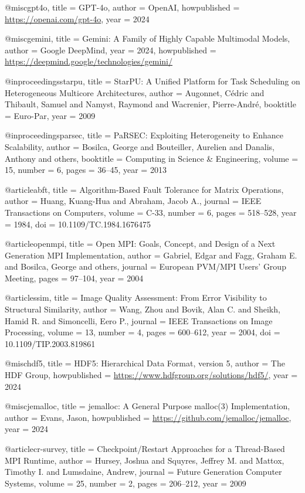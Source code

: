 @misc{gpt4o,
  title = {{GPT-4o}},
  author = {{OpenAI}},
  howpublished = {\url{https://openai.com/gpt-4o}},
  year = {2024}
}

@misc{gemini,
  title = {{Gemini}: A Family of Highly Capable Multimodal Models},
  author = {{Google DeepMind}},
  year = {2024},
  howpublished = {\url{https://deepmind.google/technologies/gemini/}}
}

@inproceedings{starpu,
  title = {{StarPU}: A Unified Platform for Task Scheduling on Heterogeneous Multicore Architectures},
  author = {Augonnet, C{\'e}dric and Thibault, Samuel and Namyst, Raymond and Wacrenier, Pierre-Andr{\'e}},
  booktitle = {Euro-Par},
  year = {2009}
}

@inproceedings{parsec,
  title = {{PaRSEC}: Exploiting Heterogeneity to Enhance Scalability},
  author = {Bosilca, George and Bouteiller, Aurelien and Danalis, Anthony and others},
  booktitle = {Computing in Science \& Engineering},
  volume = {15},
  number = {6},
  pages = {36--45},
  year = {2013}
}

@article{abft,
  title = {Algorithm-Based Fault Tolerance for Matrix Operations},
  author = {Huang, Kuang-Hua and Abraham, Jacob A.},
  journal = {IEEE Transactions on Computers},
  volume = {C-33},
  number = {6},
  pages = {518--528},
  year = {1984},
  doi = {10.1109/TC.1984.1676475}
}

@article{openmpi,
  title = {Open {MPI}: Goals, Concept, and Design of a Next Generation {MPI} Implementation},
  author = {Gabriel, Edgar and Fagg, Graham E. and Bosilca, George and others},
  journal = {European PVM/MPI Users' Group Meeting},
  pages = {97--104},
  year = {2004}
}

@article{ssim,
  title = {Image Quality Assessment: From Error Visibility to Structural Similarity},
  author = {Wang, Zhou and Bovik, Alan C. and Sheikh, Hamid R. and Simoncelli, Eero P.},
  journal = {IEEE Transactions on Image Processing},
  volume = {13},
  number = {4},
  pages = {600--612},
  year = {2004},
  doi = {10.1109/TIP.2003.819861}
}

@misc{hdf5,
  title = {{HDF5}: Hierarchical Data Format, version 5},
  author = {{The HDF Group}},
  howpublished = {\url{https://www.hdfgroup.org/solutions/hdf5/}},
  year = {2024}
}

@misc{jemalloc,
  title = {jemalloc: A General Purpose malloc(3) Implementation},
  author = {Evans, Jason},
  howpublished = {\url{https://github.com/jemalloc/jemalloc}},
  year = {2024}
}

@article{cr-survey,
  title = {Checkpoint/Restart Approaches for a Thread-Based {MPI} Runtime},
  author = {Hursey, Joshua and Squyres, Jeffrey M. and Mattox, Timothy I. and Lumsdaine, Andrew},
  journal = {Future Generation Computer Systems},
  volume = {25},
  number = {2},
  pages = {206--212},
  year = {2009}
}
